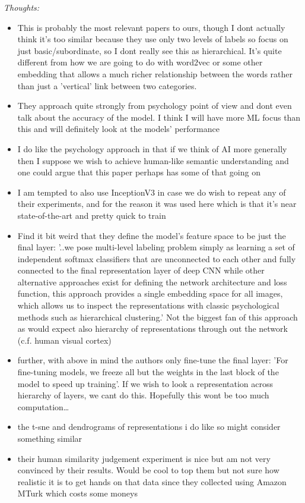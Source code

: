 \documentclass{report}
\begin{document}
\textit{Thoughts:}
\begin{itemize}
    \item This is probably the most relevant papers to ours, though I dont actually think it's too similar because they use only two levels of labels so focus on just basic/subordinate, so I dont really see this as hierarchical. It's quite different from how we are going to do with word2vec or some other embedding that allows a much richer relationship between the words rather than just a 'vertical' link between two categories.
    \item They approach quite strongly from psychology point of view and dont even talk about the accuracy of the model. I think I will have more ML focus than this and will definitely look at the models' performance
    \item I do like the psychology approach in that if we think of AI more generally then I suppose we wish to achieve human-like semantic understanding and one could argue that this paper perhaps has some of that going on
    \item I am tempted to also use InceptionV3 in case we do wish to repeat any of their experiments, and for the reason it was used here which is that it's near state-of-the-art and pretty quick to train
    \item Find it bit weird that they define the model's feature space to be just the final layer: '..we pose multi-level labeling problem simply as learning a set of independent softmax classifiers that are unconnected to each other and fully connected to the final representation layer of deep CNN  while other alternative approaches exist for defining the network architecture and loss function, this approach provides a single embedding space for all images, which allows us to inspect the representations with classic psychological methods such as hierarchical clustering.' Not the biggest fan of this approach as would expect also hierarchy of representations through out the network (c.f. human visual cortex)
   \item further, with above in mind the authors only fine-tune the final layer: 'For fine-tuning models, we freeze all but the weights in the last block of the model to speed up training'. If we wish to look a representation across hierarchy of layers, we cant do this. Hopefully this wont be too much computation\dots
   \item the t-sne and dendrograms of representations i do like so might consider something similar
   \item their human similarity judgement experiment is nice but am not very convinced by their results. Would be cool to top them but not sure how realistic it is to get hands on that data since they collected using Amazon MTurk which costs some moneys

\end{itemize}
\end{document}
